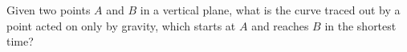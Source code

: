 \documentclass{beamer}
\begin{document}
\begin{frame}
\begin{center}
\end{center}
%
%
%
\vspace{0.5cm}
\begin{small}
{
Given two points $A$ and $B$ in a vertical plane, what is the curve traced 
out by a point acted on only by gravity, which starts at $A$ and reaches 
$B$ in the shortest time?
\par}
\end{small}
\end{frame}
\end{document}
